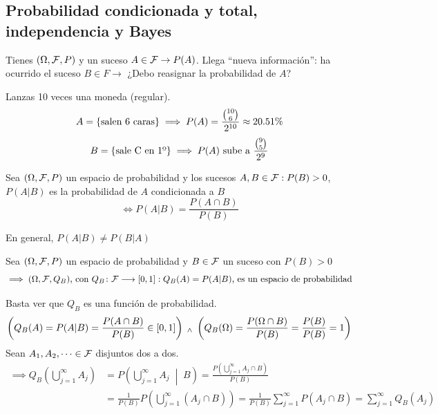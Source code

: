 \subsection{Probabilidad condicionada y total, independencia y Bayes}
Tienes $(\Omega, \mathcal{F}, P)$ y un suceso $A\in \mathcal{F} \rightarrow P(A)$. Llega ``nueva información'': ha ocurrido el suceso $B\in F \longrightarrow$ ¿Debo reasignar la probabilidad de $A$?
\begin{ejem}[Dependencia]
	Lanzas 10 veces una moneda (regular).
	\[A=\{\text{salen 6 caras}\} \implies P(A)=\frac{\binom{10}{6}}{2^{10}} \approx 20.51 \%\]
	\[B=\{\text{sale C en 1º}\} \implies P(A)\text{ sube a }\frac{\binom{9}{5}}{2^9}\]
\end{ejem}

\begin{defn}
	Sea $(\Omega, \mathcal{F}, P)$ un espacio de probabilidad y los sucesos $A, B \in \mathcal{F} : P(B)>0$, $P(A|B)$ es la probabilidad de $A$ condicionada a $B$
	\[\iff P(A|B)=\frac{P(A\cap B)}{P(B)}\]
	\begin{obs}
		En general, $P(A|B)\ne P(B|A)$
	\end{obs}
\end{defn}
\begin{prop}
	Sea $(\Omega, \mathcal{F}, P)$ un espacio de probabilidad y $B \in \mathcal{F}$ un suceso con $P(B)>0$
	\[\implies (\Omega, \mathcal{F}, Q_B) \text{, con } Q_B \colon \mathcal{F} \longrightarrow \left[0,1\right]:Q_B(A)=P(A|B) \text{, es un espacio de probabilidad}\]
	\begin{dem}
		Basta ver que $Q_B$ es una función de probabilidad.
		\[\left(Q_B(A)=P(A|B)=\frac{P(A\cap B)}{P(B)} \in \left[0, 1\right]\right) \; _{\wedge} \; \left(Q_B(\Omega)=\frac{P(\Omega\cap B)}{P(B)}=\frac{P(B)}{P(B)}=1\right)\]
		Sean $A_1, A_2, \dots \in \mathcal{F}$ disjuntos dos a dos.
		\begin{equation*}
			\begin{split}
				\implies Q_B\left(\bigcup_{j=1}^\infty A_j\right) & =P\left(\bigcup_{j=1}^\infty A_j\;\middle|\; B\right)=\frac{P\left(\bigcup_{j=1}^\infty A_j \cap B\right)}{P(B)}                         \\
				                                                  & =\frac{1}{P(B)}P\left(\bigcup_{j=1}^\infty (A_j \cap B)\right)=\frac{1}{P(B)}\sum_{j=1}^\infty P(A_j\cap B) = \sum_{j=1}^\infty Q_B(A_j)
			\end{split}
		\end{equation*}
	\end{dem}
\end{prop}

